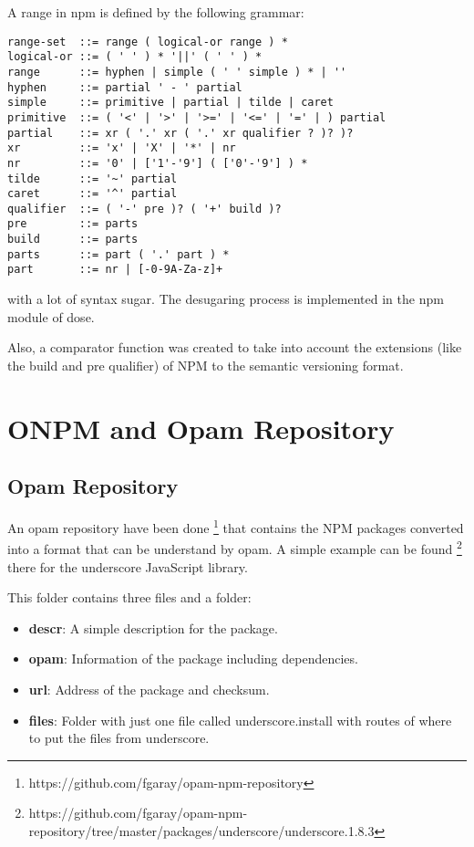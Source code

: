 \documentclass[letterpaper,12pt]{report}
\begin{document}
A range in npm is defined by the following grammar:

\begin{verbatim}
range-set  ::= range ( logical-or range ) *
logical-or ::= ( ' ' ) * '||' ( ' ' ) *
range      ::= hyphen | simple ( ' ' simple ) * | ''
hyphen     ::= partial ' - ' partial
simple     ::= primitive | partial | tilde | caret
primitive  ::= ( '<' | '>' | '>=' | '<=' | '=' | ) partial
partial    ::= xr ( '.' xr ( '.' xr qualifier ? )? )?
xr         ::= 'x' | 'X' | '*' | nr
nr         ::= '0' | ['1'-'9'] ( ['0'-'9'] ) *
tilde      ::= '~' partial
caret      ::= '^' partial
qualifier  ::= ( '-' pre )? ( '+' build )?
pre        ::= parts
build      ::= parts
parts      ::= part ( '.' part ) *
part       ::= nr | [-0-9A-Za-z]+
\end{verbatim}

with a lot of syntax sugar. The desugaring process is implemented in the npm
module of dose.


Also, a comparator function was created to take into account the extensions
(like the build and pre qualifier) of NPM to the semantic versioning format.



\section{ONPM and Opam Repository}

\subsection{Opam Repository}

An opam repository have been done
\footnote{https://github.com/fgaray/opam-npm-repository} that contains the NPM
packages converted into a format that can be understand by opam. A simple
example can be found \footnote{https://github.com/fgaray/opam-npm-repository/tree/master/packages/underscore/underscore.1.8.3}
there for the underscore JavaScript library.

This folder contains three files and a folder:

\begin{itemize}
  \item \textbf{descr}: A simple description for the package.
  \item \textbf{opam}: Information of the package including dependencies.
  \item \textbf{url}: Address of the package and checksum.
  \item \textbf{files}: Folder with just one file called underscore.install with
    routes of where to put the files from underscore.
\end{itemize}
\end{document}
